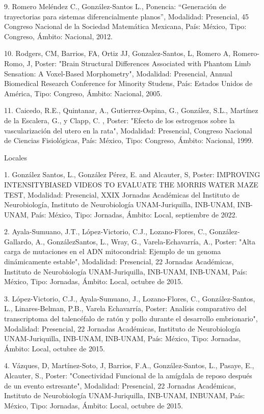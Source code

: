 \documentclass[12pt]{article}
\begin{document}
9. Romero Meléndez C., González-Santos L., Ponencia: “Generación de trayectorias para sistemas diferencialmente planos”, Modalidad: 
Presencial, 45 Congreso Nacional de la Sociedad Matemática Mexicana, País: México, Tipo: Congreso, Ámbito: Nacional, 2012.

10. Rodgers, CM, Barrios, FA, Ortiz JJ, Gonzalez-Santos, L, Romero A, Romero-Romo, J, Poster: "Brain Structural Differences Associated 
with Phantom Limb Sensation: A Voxel-Based Morphometry", Modalidad: Presencial, Annual Biomedical Research Conference for Minority 
Studens, País: Estados Unidos de América, Tipo: Congreso, Ámbito: Nacional, 2005.

11. Caicedo, R.E., Quintanar, A., Gutierrez-Ospina, G., González, S.L., Martínez de la Escalera, G., y Clapp, C. , Poster: "Efecto de 
los estrogenos sobre la vascularización del utero en la rata", Modalidad: Presencial, Congreso Nacional de Ciencias Fisiológicas, País: 
México, Tipo: Congreso, Ámbito: Nacional, 1999.

Locales

1. González Santos, L., González Pérez, E. and Alcauter, S, Poster: IMPROVING INTENSITYBIASED VIDEOS TO EVALUATE THE MORRIS WATER MAZE 
TEST, Modalidad: Presencial, XXIX Jornadas Académicas del Instituto de Neurobiología, Instituto de Neurobiología UNAM-Juriquilla, 
INB-UNAM, INB-UNAM, País: México, Tipo: Jornadas, Ámbito: Local, septiembre de 2022.

2. Ayala-Sumuano, J.T., López-Victorio, C.J., Lozano-Flores, C., González-Gallardo, A., GonzálezSantos, L., Wray, G., 
Varela-Echavarría, A., Poster: "Alta carga de mutaciones en el ADN mitocondrial: Ejemplo de un genoma dinámicamente estable", 
Modalidad: Presencial, 22 Jornadas Académicas, Instituto de Neurobiología UNAM-Juriquilla, INB-UNAM, INB-UNAM, País: México, Tipo: 
Jornadas, Ámbito: Local, octubre de 2015.

3. López-Victorio, C.J., Ayala-Sumuano, J., Lozano-Flores, C., González-Santos, L., Linares-Belman, P.B., Varela 
Echavarría, Poster: Analísis comparativo del transcriptoma del talencéfalo de ratón y pollo durante el desarrollo embrionario", 
Modalidad: Presencial, 22 Jornadas Académicas, Instituto de Neurobiología UNAM-Juriquilla, INB-UNAM, INB-UNAM, País: México, Tipo: 
Jornadas, Ámbito: Local, octubre de 2015.

4. Vázques, D, Martínez-Soto, J, Barrios, F.A., González-Santos, L., Pasaye, E., Alcauter, S., Poster: "Conectividad Funcional de la 
amígdala de reposo después de un evento estresante", Modalidad: Presencial, 22 Jornadas Académicas, Instituto de Neurobiología 
UNAM-Juriquilla, INB-UNAM, INBUNAM, País: México, Tipo: Jornadas, Ámbito: Local, octubre de 2015.
\end{document}

